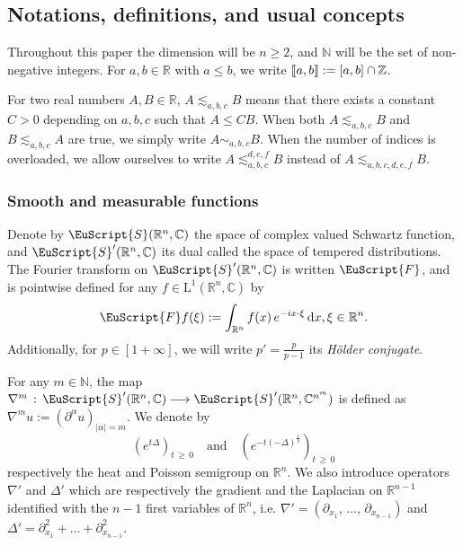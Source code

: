 \documentclass[AHL,Unicode,longabstracts,published]{cedram}
\newcommand{\bbR}{\mathbb{R}}
\newcommand{\bbC}{\mathbb{C}}
\newcommand{\bbN}{\mathbb{N}}
\newcommand{\bbZ}{\mathbb{Z}}
\newcommand{\rmd}{\mathrm{d}}
\newcommand{\rmL}{\mathrm{L}}
\newcommand{\eus}{\EuScript}
\newcommand{\llbracket}{\mathopen{[\mkern -2.7mu[}}
\newcommand{\rrbracket}{\mathclose{]\mkern -2.7mu]}}
\newcommand{\llb}{\llbracket}
\newcommand{\rrb}{\rrbracket}
\begin{document}
\subsection{Notations, definitions, and usual concepts}

Throughout this paper the dimension will be $n\geqslant 2$, and $\bbN $ will be the set of non-negative integers. For $a,b\in\bbR$ with $a\leqslant b$, we write $\llb a,b\rrb:=[a,b]\cap\bbZ$.

For two real numbers $A,B\in\bbR$, $A\lesssim_{a,b,c} B$ means that there exists a constant $C>0$ depending on ${a,b,c}$ such that $A\leqslant C B$. When both $A\lesssim_{a,b,c} B$ and $B \lesssim_{a,b,c} A$ are true, we simply write $A\sim_{a,b,c} B$. When the number of indices is overloaded, we allow ourselves to write $A\lesssim_{a,b,c}^{d,e,f} B$ instead of $A\lesssim_{a,b,c,d,e,f} B$.

\subsubsection{Smooth and measurable functions}

Denote by $\eus{S}(\bbR^n,\bbC)$ the space of complex valued Schwartz function, and
$\eus{S}'(\bbR^n,\bbC)$ its dual called the space of tempered distributions. The Fourier transform on $\eus{S}'(\bbR^n,\bbC)$ is written $\eus{F}$, and is pointwise defined for any $f\in\rmL^1(\bbR^n,\bbC)$ by
\begin{align*}
\eus{F}f(\xi):=\int_{\bbR^n} f(x)\,
e^{-ix\cdot\xi}\,\rmd x, \xi\in\bbR^n.
\end{align*}
Additionally, for $p\in[1+\infty]$, we will write $p'=\tfrac{p}{p-1}$ its
\emph{H\"older conjugate}.

For any $m\in\bbN $, the map $\nabla^m\,:\,\eus{S}'(\bbR^n,\bbC)\longrightarrow \eus{S}'(\bbR^n,\bbC^{n^m})$ is defined as $\nabla^m u:= (\partial^\alpha u)_{|\alpha|=m}$. We denote by
\[
\left(e^{t\Delta}\right)_{t\,\geqslant\,0}\quad \text{and} \quad\left(e^{-t(-\Delta)^\frac{1}{2}}\right)_{t\,\geqslant\,0}
\]
respectively the heat and Poisson semigroup on $\bbR^n$. We also introduce operators $\nabla'$ and $\Delta'$ which are respectively the gradient and the Laplacian on $\bbR^{n-1}$ identified with the $n-1$ first variables of $\bbR^n$, i.e. $\nabla'=(\partial_{x_1},\,\ldots,\, \partial_{x_{n-1}})$ and $\Delta' = \partial_{x_1}^2 + \ldots + \partial_{x_{n-1}}^2$.
\end{document}
